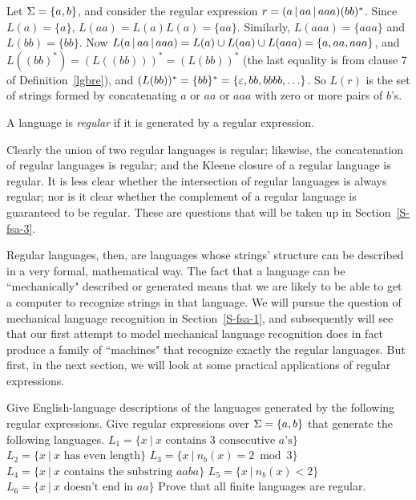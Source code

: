 \begin{example}
Let $\Sigma = \mbox{$\{a,b\}$}$, and consider the regular expression $r=(a\hbox{$\,|\,$} aa\hbox{$\,|\,$} aaa)(bb)^*$.
Since $L(a) = \{a\}$, $L(aa) = L(a)L(a) = \{aa\}$.  Similarly, $L(aaa) = \{aaa\}$
and $L(bb) = \{bb\}$.  Now $L(a\hbox{$\,|\,$} aa\hbox{$\,|\,$} aaa) = L(a) \cup L(aa) \cup L(aaa) = \{a, aa,
aaa\}$, and $L((bb)^*) = (L((bb)))^* = (L(bb))^*$  (the last equality is from
clause 7 of Definition~\ref{lgbre}), and $(L(bb))^* = \{bb\}^* = \{\varepsilon, bb,
bbbb, \ldots\}$.  So $L(r)$ is the set of strings formed by
concatenating $a$ or $aa$ or $aaa$ with zero or more pairs of $b$'s.
\end{example}

\begin{definition}
A language is {\em regular} if it is generated by
a regular expression.
\end{definition}

Clearly the union of two regular languages is regular; likewise, 
the concatenation of regular languages is regular; and the Kleene
closure of a regular language is regular. It is less clear whether the
intersection of regular languages is always regular; nor is it clear whether the
complement of a regular language is guaranteed to be regular.  These are
questions that will be taken up in Section~\ref{S-fsa-3}.

Regular languages, then, are languages whose strings' structure can be described
in a very formal, mathematical way.  The fact that a language can be
``mechanically" described or generated means that we are likely to be
able to get a computer to recognize strings in that language.
We will pursue the question of mechanical language recognition in
Section~\ref{S-fsa-1}, and subsequently will see that our first attempt to model mechanical
language recognition does in fact produce a family of ``machines" that recognize
exactly the regular languages.  But first, in the next section, we will look at some
practical applications of regular expressions.

\begin{exercises}
\problem Give English-language descriptions of the languages generated by the
following regular expressions.
\problem Give regular expressions over $\Sigma=\mbox{$\{a,b\}$}$ that generate the 
following languages.
\ppart $L_1 = \{ x \ | \ x \mbox{ contains 3 consecutive $a$'s}\}$
\ppart $L_2 = \{ x \ | \ x \mbox{ has even length}\}$
\ppart $L_3 = \{ x \ | \ n_b(x) = 2 \bmod{3}\}$
\ppart $L_4 = \{ x \ | \ x \mbox{ contains the substring } aaba\}$
\ppart $L_5 = \{ x \ | \ n_b(x) < 2 \}$
\ppart $L_6 = \{ x \ | \ x \mbox{ doesn't end in } aa\}$
\problem Prove that all finite languages are regular.

\end{exercises}



